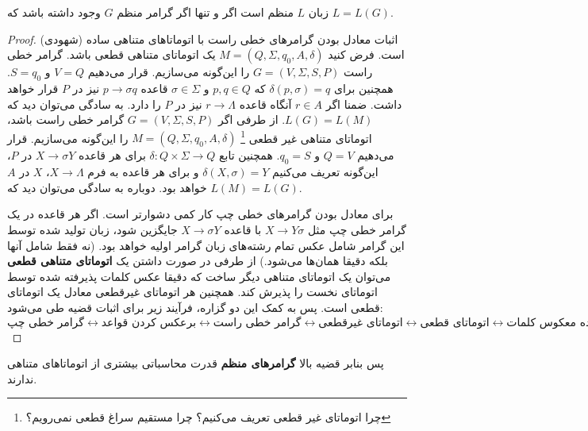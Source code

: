 \documentclass[main.tex]{subfiles}
\begin{document}
	\begin{theorem}
		زبان $L$ منظم است اگر و تنها اگر گرامر منظم $G$ وجود داشته باشد که 
		$L = L(G)$.
	\end{theorem}
	\begin{proof}
		(شهودی) اثبات معادل بودن گرامر‌های خطی راست با اتوماتا‌های متناهی ساده است. فرض کنید 
		$M = (Q, \Sigma, q_0, A, \delta)$
		یک اتوماتای متناهی قطعی 
		باشد. گرامر خطی راست 
		$G = (V, \Sigma, S, P)$
		را این‌گونه می‌سازیم. قرار می‌دهیم 
		$V = Q$
		و 
		$S = q_0$.
		همچنین برای 
		$\delta(p, \sigma) = q$
		که 
		$p, q \in Q$
		و
		$\sigma \in \Sigma$
		قاعده
		$p \rightarrow \sigma q $
		نیز در $P$ قرار خواهد داشت. ضمنا اگر 
		$r \in A$
		آنگاه قاعده 
		$r \rightarrow \Lambda$
		نیز در $P$ را دارد.
		 به سادگی می‌توان دید که 
		$L(G) = L(M)$.
		از طرفی اگر 
		$G = (V, \Sigma, S, P)$
		گرامر خطی راست باشد، اتوماتای متناهی غیر قطعی
		\footnote{
			چرا اتوماتای غیر قطعی تعریف می‌کنیم؟ چرا مستقیم سراغ قطعی نمی‌رویم؟	
		}
$M = (Q, \Sigma, q_0, A, \delta)$
را این‌گونه می‌سازیم. قرار می‌دهیم 
		 $Q = V$
		 و
		 $q_0 = S$.
		 همچنین تابع 
		 $\delta : Q \times \Sigma \rightarrow Q$
		  برای هر قاعده
		 $X \rightarrow \sigma Y$
		 در $P$، این‌گونه تعریف می‌کنیم 
		 $\delta(X, \sigma) = Y$
		 و
		 برای هر قاعده به فرم
		 $X \rightarrow \Lambda$،
		 $X$
		 در 
		 $A$
		 خواهد بود. دوباره به سادگی می‌توان دید که 
		 $L(M) = L(G)$.
		 
		 برای معادل بودن گرامر‌های خطی چپ کار کمی دشوارتر است. اگر  هر قاعده در یک گرامر خطی چپ مثل 
		 $X \rightarrow Y \sigma$
		 با قاعده 
		 $X \rightarrow \sigma Y$
		 جایگزین شود، زبان تولید شده توسط این گرامر شامل عکس تمام رشته‌های زبان گرامر اولیه خواهد بود. (نه فقط شامل آنها بلکه دقیقا همان‌ها می‌شود.) از طرفی در صورت داشتن یک \textbf{اتوماتای متناهی قطعی} می‌توان یک اتوماتای متناهی دیگر ساخت که دقیقا عکس کلمات پذیرفته شده توسط اتوماتای نخست را پذیرش کند. همچنین هر اتوماتای غیرقطعی معادل یک اتوماتای قطعی است. پس به کمک این دو گزاره، فرآیند زیر برای اثبات قضیه طی می‌شود:
		 $$
		 \text{گرامر خطی چپ}
		 \longleftrightarrow
		 \text{برعکس کردن قواعد}
		 \longleftrightarrow
		 \text{گرامر خطی راست}
		 \longleftrightarrow
		 \text{اتوماتای غیرقطعی}
		 \longleftrightarrow
		 \text{اتوماتای قطعی}
		 \longleftrightarrow
		 \text{اتوماتای پذیرنده معکوس کلمات}
		 $$
	\end{proof}
پس بنابر قضیه بالا \textbf{گرامر‌های منظم }قدرت محاسباتی بیشتری از اتوماتا‌های متناهی ندارند.
\end{document}
